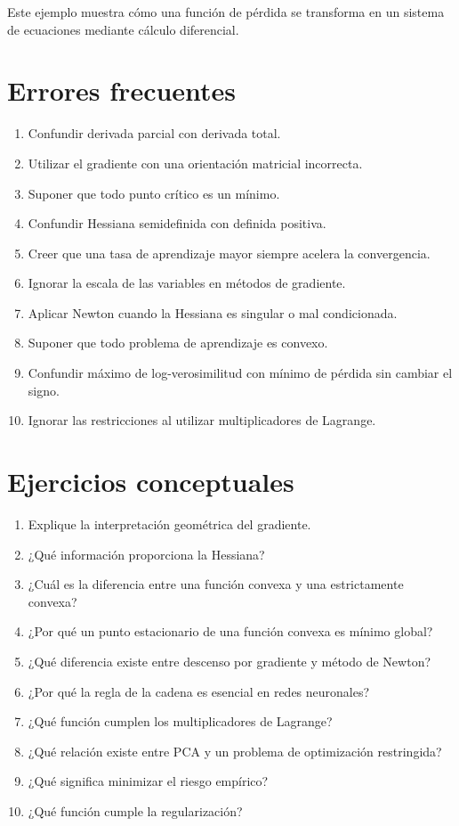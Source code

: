 \documentclass[
  spanish,
  11pt,
  letterpaper,
  DIV=11,
  numbers=noendperiod]{scrreprt}
\providecommand{\tightlist}{%
  \setlength{\itemsep}{0pt}\setlength{\parskip}{0pt}}
\theoremstyle{definition}
\theoremstyle{plain}
\theoremstyle{definition}
\theoremstyle{remark}
\begin{document}
Este ejemplo muestra cómo una función de pérdida se transforma en un
sistema de ecuaciones mediante cálculo diferencial.

\section{Errores frecuentes}\label{errores-frecuentes-3}

\begin{enumerate}
\def\labelenumi{\arabic{enumi}.}
\tightlist
\item
  Confundir derivada parcial con derivada total.
\item
  Utilizar el gradiente con una orientación matricial incorrecta.
\item
  Suponer que todo punto crítico es un mínimo.
\item
  Confundir Hessiana semidefinida con definida positiva.
\item
  Creer que una tasa de aprendizaje mayor siempre acelera la
  convergencia.
\item
  Ignorar la escala de las variables en métodos de gradiente.
\item
  Aplicar Newton cuando la Hessiana es singular o mal condicionada.
\item
  Suponer que todo problema de aprendizaje es convexo.
\item
  Confundir máximo de log-verosimilitud con mínimo de pérdida sin
  cambiar el signo.
\item
  Ignorar las restricciones al utilizar multiplicadores de Lagrange.
\end{enumerate}

\section{Ejercicios conceptuales}\label{ejercicios-conceptuales-3}

\begin{enumerate}
\def\labelenumi{\arabic{enumi}.}
\tightlist
\item
  Explique la interpretación geométrica del gradiente.
\item
  ¿Qué información proporciona la Hessiana?
\item
  ¿Cuál es la diferencia entre una función convexa y una estrictamente
  convexa?
\item
  ¿Por qué un punto estacionario de una función convexa es mínimo
  global?
\item
  ¿Qué diferencia existe entre descenso por gradiente y método de
  Newton?
\item
  ¿Por qué la regla de la cadena es esencial en redes neuronales?
\item
  ¿Qué función cumplen los multiplicadores de Lagrange?
\item
  ¿Qué relación existe entre PCA y un problema de optimización
  restringida?
\item
  ¿Qué significa minimizar el riesgo empírico?
\item
  ¿Qué función cumple la regularización?
\end{enumerate}
\end{document}
